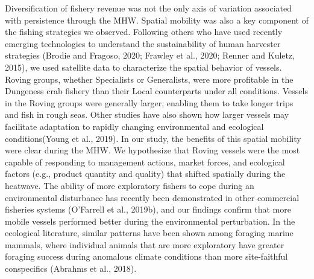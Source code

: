 \documentclass[]{elsarticle} %
\begin{document}
Diversification of fishery revenue was not the only axis of variation
associated with persistence through the MHW. Spatial mobility was also a
key component of the fishing strategies we observed. Following others
who have used recently emerging technologies to understand the
sustainability of human harvester strategies (Brodie and Fragoso, 2020;
Frawley et al., 2020; Renner and Kuletz, 2015), we used satellite data
to characterize the spatial behavior of vessels. Roving groups, whether
Specialists or Generalists, were more profitable in the Dungeness crab
fishery than their Local counterparts under all conditions. Vessels in
the Roving groups were generally larger, enabling them to take longer
trips and fish in rough seas. Other studies have also shown how larger
vessels may facilitate adaptation to rapidly changing environmental and
ecological conditions(Young et al., 2019). In our study, the benefits of
this spatial mobility were clear during the MHW. We hypothesize that
Roving vessels were the most capable of responding to management
actions, market forces, and ecological factors (e.g., product quantity
and quality) that shifted spatially during the heatwave. The ability of
more exploratory fishers to cope during an environmental disturbance has
recently been demonstrated in other commercial fisheries systems
(O'Farrell et al., 2019b), and our findings confirm that more mobile
vessels performed better during the environmental perturbation. In the
ecological literature, similar patterns have been shown among foraging
marine mammals, where individual animals that are more exploratory have
greater foraging success during anomalous climate conditions than more
site-faithful conspecifics (Abrahms et al., 2018).
\end{document}
